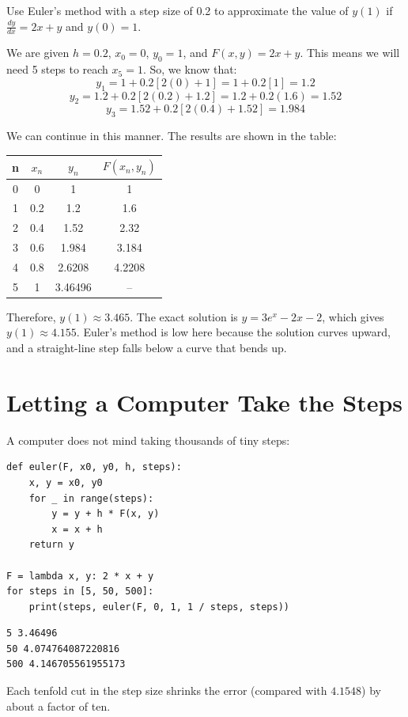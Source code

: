 \begin{Worked}
\begin{Problem}
Use Euler's method with a step size of 0.2 to approximate
the value of $y(1)$ if $\frac{dy}{dx} = 2x + y$ and $y(0) = 1$. 
\end{Problem}
\begin{Solution}
We are given $h = 0.2$, $x_0 = 0$, $y_0 = 1$, and $F(x, y)
= 2x + y$. This means we will need 5 steps to reach $x_{5} = 1$. So, we know 
that:
$$y_1 = 1 + 0.2[2(0) + 1] = 1 + 0.2[1] = 1.2$$
$$y_2 = 1.2 + 0.2[2(0.2) + 1.2] = 1.2 + 0.2(1.6) = 1.52$$
$$y_3 = 1.52 + 0.2[2(0.4) + 1.52] = 1.984$$

We can continue in this manner. The results are shown in the table:
\begin{center}
\begin{tabular}{|c|c|c|c|}\hline
n & $x_n$ & $y_n$ & $F(x_n, y_n)$ \\\hline
0 & 0 & 1 & 1\\\hline
1 & 0.2 & 1.2 & 1.6\\\hline
2 & 0.4 & 1.52 & 2.32\\\hline
3 & 0.6 & 1.984 & 3.184\\\hline
4 & 0.8 & 2.6208 & 4.2208\\\hline
5 & 1 & 3.46496 & --\\\hline
\end{tabular}
\end{center}

Therefore, $y(1) \approx 3.465$. The exact solution is $y = 3e^x - 2x - 2$, which gives $y(1) \approx 4.155$. Euler's method is low here because the solution curves upward, and a straight-line step falls below a curve that bends up.
\end{Solution}
\end{Worked}

\section{Letting a Computer Take the Steps}
A computer does not mind taking thousands of tiny steps:
\begin{verbatim}
def euler(F, x0, y0, h, steps):
    x, y = x0, y0
    for _ in range(steps):
        y = y + h * F(x, y)
        x = x + h
    return y

F = lambda x, y: 2 * x + y
for steps in [5, 50, 500]:
    print(steps, euler(F, 0, 1, 1 / steps, steps))
\end{verbatim}
\begin{verbatim}
5 3.46496
50 4.074764087220816
500 4.146705561955173
\end{verbatim}
Each tenfold cut in the step size shrinks the error (compared with
$4.1548$) by about a factor of ten.

